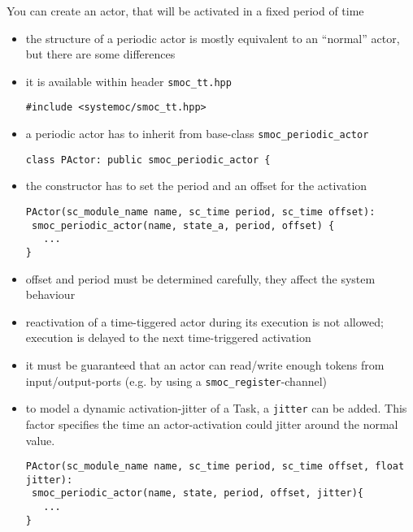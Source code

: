 \begin{frame}[fragile=singleslide]
You can create an actor, that will be activated in a fixed period of time
\begin{itemize}
\item the structure of a periodic actor is mostly equivalent to an ``normal'' actor,
 but there are some differences
\item it is available within header \lstinline{smoc_tt.hpp}
\begin{lstlisting}
#include <systemoc/smoc_tt.hpp>
\end{lstlisting}

\item a periodic actor has to inherit from base-class \lstinline{smoc_periodic_actor}
\begin{lstlisting}
class PActor: public smoc_periodic_actor {
\end{lstlisting}
\item the constructor has to set the period and an offset for the activation
\begin{lstlisting}
PActor(sc_module_name name, sc_time period, sc_time offset):
 smoc_periodic_actor(name, state_a, period, offset) {
   ...
}
\end{lstlisting}
\end{itemize}
\end{frame}




\begin{frame}[fragile=singleslide]
\begin{itemize}
\item offset and period must be determined carefully, they affect the system behaviour
\item reactivation of a time-tiggered actor during its execution is not allowed; execution is delayed to the next time-triggered activation
\item it must be guaranteed that an actor can read/write enough tokens from input/output-ports (e.g. by using a \lstinline{smoc_register}-channel)
\item to model a dynamic activation-jitter of a Task, a \lstinline{jitter} can be added. This factor specifies the time an actor-activation could jitter around the normal value.
\begin{lstlisting}
PActor(sc_module_name name, sc_time period, sc_time offset, float jitter):
 smoc_periodic_actor(name, state, period, offset, jitter){
   ...
}
\end{lstlisting}
\end{itemize}
\end{frame}




